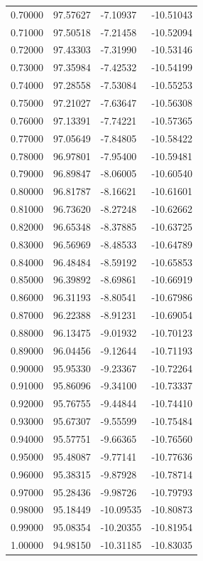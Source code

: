 \begin{table}
\begin{tabular}{llll}
0.70000 & 97.57627 & -7.10937 & -10.51043 \\
0.71000 & 97.50518 & -7.21458 & -10.52094 \\
0.72000 & 97.43303 & -7.31990 & -10.53146 \\
0.73000 & 97.35984 & -7.42532 & -10.54199 \\
0.74000 & 97.28558 & -7.53084 & -10.55253 \\
0.75000 & 97.21027 & -7.63647 & -10.56308 \\
0.76000 & 97.13391 & -7.74221 & -10.57365 \\
0.77000 & 97.05649 & -7.84805 & -10.58422 \\
0.78000 & 96.97801 & -7.95400 & -10.59481 \\
0.79000 & 96.89847 & -8.06005 & -10.60540 \\
0.80000 & 96.81787 & -8.16621 & -10.61601 \\
0.81000 & 96.73620 & -8.27248 & -10.62662 \\
0.82000 & 96.65348 & -8.37885 & -10.63725 \\
0.83000 & 96.56969 & -8.48533 & -10.64789 \\
0.84000 & 96.48484 & -8.59192 & -10.65853 \\
0.85000 & 96.39892 & -8.69861 & -10.66919 \\
0.86000 & 96.31193 & -8.80541 & -10.67986 \\
0.87000 & 96.22388 & -8.91231 & -10.69054 \\
0.88000 & 96.13475 & -9.01932 & -10.70123 \\
0.89000 & 96.04456 & -9.12644 & -10.71193 \\
0.90000 & 95.95330 & -9.23367 & -10.72264 \\
0.91000 & 95.86096 & -9.34100 & -10.73337 \\
0.92000 & 95.76755 & -9.44844 & -10.74410 \\
0.93000 & 95.67307 & -9.55599 & -10.75484 \\
0.94000 & 95.57751 & -9.66365 & -10.76560 \\
0.95000 & 95.48087 & -9.77141 & -10.77636 \\
0.96000 & 95.38315 & -9.87928 & -10.78714 \\
0.97000 & 95.28436 & -9.98726 & -10.79793 \\
0.98000 & 95.18449 & -10.09535 & -10.80873 \\
0.99000 & 95.08354 & -10.20355 & -10.81954 \\
1.00000 & 94.98150 & -10.31185 & -10.83035 \\

\end{tabular}
\end{table}
